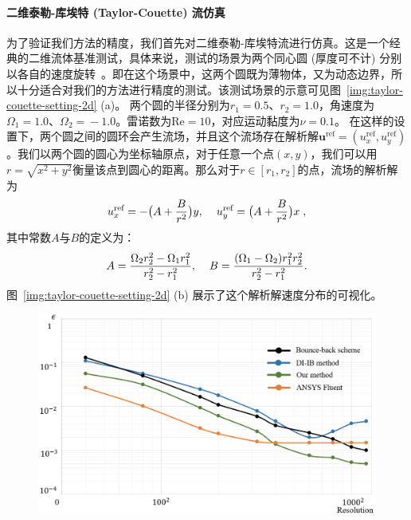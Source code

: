 \paragraph{二维泰勒-库埃特 (Taylor-Couette) 流仿真}
为了验证我们方法的精度，我们首先对二维泰勒-库埃特流进行仿真。这是一个经典的二维流体基准测试，具体来说，测试的场景为两个同心圆 (厚度可不计) 分别以各自的速度旋转~\cite{xu2006immersed}。即在这个场景中，这两个圆既为薄物体，又为动态边界，所以十分适合对我们的方法进行精度的测试。该测试场景的示意可见图~\ref{img:taylor-couette-setting-2d} (a)。
两个圆的半径分别为$r_1 \!=\! 0.5$、$r_2 \!=\! 1.0$，角速度为$\Omega_1 \!=\! 1.0$、$\Omega_2 \!=\! -1.0$。雷诺数为$\text{Re} \!=\! 10$，对应运动黏度为$\nu \!=\! 0.1$。
在这样的设置下，两个圆之间的圆环会产生流场，并且这个流场存在解析解$\bm{u}^\text{ref}\!=\!(u_x^\text{ref},u_y^\text{ref})$。我们以两个圆的圆心为坐标轴原点，对于任意一个点$(x,y)$，我们可以用$r\!=\!\sqrt{x^2+y^2}$衡量该点到圆心的距离。那么对于$r\!\in\![r_1, r_2]$的点，流场的解析解为
\begin{equation}
u_x^\text{ref} = -\bigl(A + \frac{B}{r^2}\bigr)y, \hspace{4mm} u_y^\text{ref} = \bigl(A + \frac{B}{r^2}\bigr)x\;,
\end{equation}
\noindent 其中常数$A$与$B$的定义为：
\begin{equation}
A = \frac{\Omega_2 r_2^2 - \Omega_1 r_1^2}{r_2^2 - r_1^2}, \hspace{4mm} B= \frac{(\Omega_1 - \Omega_2)r_1^2r_2^2}{r_2^2 - r_1^2}.
\end{equation}
图~\ref{img:taylor-couette-setting-2d} (b) 展示了这个解析解速度分布的可视化。

\begin{figure}[!htbp]
  \centering
    \includegraphics[width=0.94\columnwidth]{figures/taylor-couette-error-compare.png}
  \label{img:taylor-couette-error-compare}
\end{figure}


